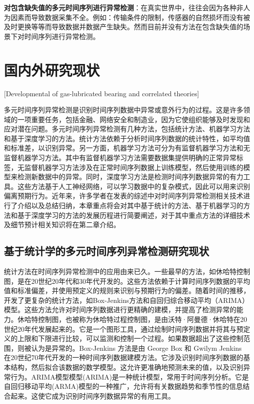 \textbf{对包含缺失值的多元时间序列进行异常检测}：在真实世界中，往往会因为各种非人为因素而导致数据采集不全。例如：传输条件的限制，传感器的自然损坏而没有被及时更换等等而导致数据并数据产生缺失。然而目前并没有方法在包含缺失值的场景下对时间序列进行异常检测。

\section{国内外研究现状}[Developmental of gas-lubricated bearing and correlated theories]

多元时间序列异常检测是识别时间序列数据中异常或意外行为的过程。这是许多领域的一项重要任务，包括金融、网络安全和制造业，因为它使组织能够及时发现和应对潜在问题。多元时间序列异常检测有几种方法，包括统计方法、机器学习方法和基于深度学习的方法。统计方法依赖于分析时间序列数据的统计特性，如平均值和标准差，以识别异常。另一方面，机器学习方法可分为有监督机器学习方法和无监督机器学习方法。其中有监督机器学习方法需要数据集提供明确的正常异常标签，无监督机器学习方法涉及在正常时间序列数据上训练模型，然后使用训练的模型来检测新数据中的异常。同时，深度学习方法是检测时间序列数据异常的有力工具。这些方法基于人工神经网络，可以学习数据中的复杂模式，因此可以用来识别偏离预期行为。近年来，许多学者在发表的综述中对时间序列异常检测相关技术进行了介绍以及总结归纳，本章重点将会对其中基于统计的方法、基于机器学习的方法和基于深度学习的方法的发展历程进行简要阐述，对于其中重点方法的详细技术及细节预计相关知识将在第二章介绍。

\subsection{基于统计学的多元时间序列异常检测研究现状}

统计方法在时间序列异常检测中的应用由来已久。一些最早的方法，如休哈特控制图，是在20世纪20年代和30年代开发的。这些方法依赖于计算时间序列数据的平均值和标准偏差，并使用预定义的规则来识别与预期行为的偏差。随着时间的推移，开发了更复杂的统计方法，如Box-Jenkins\cite{box-jek}方法和自回归综合移动平均（ARIMA）模型\cite{arimax}。这些方法允许对时间序列数据进行更精确的建模，并提高了检测异常的能力。休哈特控制图，也被称为休哈特过程控制图，是由沃特·阿曼德·休哈特在20世纪20年代发展起来的。它是一个图形工具，通过绘制时间序列数据并将其与预定义的上限和下限进行比较，可以监测和控制一个过程。如果数据超出了这些控制范围，则被认为是异常的。Box-Jenkins 方法是由 George Box 和 Gwilym Jenkins 在20世纪70年代开发的一种时间序列数据建模方法。它涉及识别时间序列数据的基本结构，然后拟合该数据的数学模型。这允许更准确地预测未来的值，以及识别异常行为。ARIMA模型模型(ARIMA)是一种统计模型，常用于时间序列分析。它是自回归移动平均(ARMA)模型的一种推广，允许将有关数据趋势和季节性的信息结合起来。这使它成为识别时间序列数据异常的有用工具。

